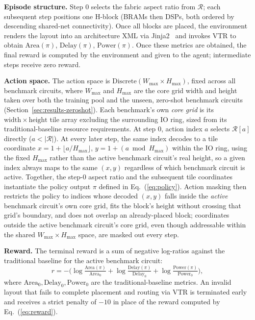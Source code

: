 \documentclass[sigconf]{acmart}
\begin{document}
\textbf{Episode structure.} Step 0 selects the fabric aspect ratio from
$\mathcal{R}$; each subsequent step positions one H-block (BRAMs then DSPs,
both ordered by descending shared-net connectivity). Once all blocks are placed,
the environment renders the layout into an architecture XML via Jinja2~\cite{jinja2} and invokes
VTR to obtain $\mathrm{Area}(\pi)$, $\mathrm{Delay}(\pi)$, $\mathrm{Power}(\pi)$. Once these metrics are obtained, the final reward is computed by the environment and given to the agent;
intermediate steps receive zero reward.

\textbf{Action space.} The action space is $\mathrm{Discrete}(W_{\max} \times
H_{\max})$, fixed across all benchmark circuits, where $W_{\max}$ and
$H_{\max}$ are the core grid width and height taken over both the training
pool and the unseen, zero-shot benchmark circuits (Section~\ref{sec:results-zeroshot}). Each benchmark's own
\emph{core grid} is its $\mathrm{width} \times \mathrm{height}$ tile array
excluding the surrounding IO ring, sized from its traditional-baseline
resource requirements. At step 0, action index
$a$ selects $\mathcal{R}[a]$ directly ($a < |\mathcal{R}|$).
At every later step, the same index decodes to a tile coordinate
$x = 1 + \lfloor a / H_{\max} \rfloor$, $y = 1 + (a \bmod H_{\max})$ within
the IO ring, using the fixed $H_{\max}$ rather than the active benchmark
circuit's real height, so a given index always maps to the same $(x,y)$
regardless of which benchmark circuit is active. Together, the step-0 aspect
ratio and the subsequent tile coordinates instantiate the policy output
$\pi$ defined in Eq.~(\ref{eq:policy}). Action masking then
restricts the policy to indices whose decoded $(x,y)$ falls inside the
\emph{active} benchmark circuit's own core grid, fits the block's height
without crossing that grid's boundary, and does not overlap an
already-placed block; coordinates outside the active benchmark circuit's
core grid, even though addressable within the shared
$W_{\max} \times H_{\max}$ space, are masked out every step.

\textbf{Reward.} The terminal reward is a sum of negative log-ratios
against the traditional baseline for the active benchmark circuit:
\begin{equation}
\label{eq:reward}
  r = -\Big(
    \log\tfrac{\mathrm{Area}(\pi)}{\mathrm{Area}_0} +
    \log\tfrac{\mathrm{Delay}(\pi)}{\mathrm{Delay}_0} +
    \log\tfrac{\mathrm{Power}(\pi)}{\mathrm{Power}_0}
  \Big),
\end{equation}
where $\mathrm{Area}_0,\mathrm{Delay}_0,\mathrm{Power}_0$ are the
traditional-baseline metrics. An invalid layout that fails to complete
placement and routing via VTR is terminated early and receives a strict
penalty of $-10$ in place of the reward computed by Eq.~(\ref{eq:reward}).
\end{document}
